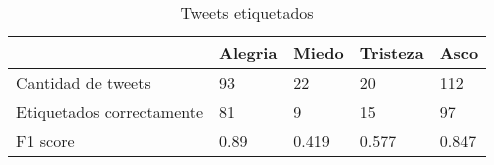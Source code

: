 \begin{table}
\caption{Tweets etiquetados}
\label{table:labeled_tweets}
\begin{tabular}{lllll}
\toprule
 & Alegria & Miedo & Tristeza & Asco \\
\midrule
Cantidad de tweets & 93 & 22 & 20 & 112 \\
Etiquetados correctamente & 81 & 9 & 15 & 97 \\
F1 score & 0.89 & 0.419 & 0.577 & 0.847 \\
\bottomrule
\end{tabular}
\end{table}
